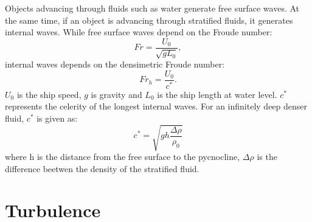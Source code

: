 \documentclass[a4paper, 12pt]{report}
\begin{document}
Objects advancing through fluids such as water generate free surface waves. At the same time, if an object is advancing through stratified fluids, it generates internal waves. While free surface waves depend on the Froude number: 
\begin{equation}
Fr = \frac{U_0}{\sqrt{gL_0}},
\label{eqn:FroudeNumber}
\end{equation} 
internal waves depends on the densimetric Froude number:
\begin{equation}
Fr_h = \frac{U_0}{c^*}.
\label{eqn:densimetricFroudeNumber}
\end{equation}
$U_0$ is the ship speed, $g$ is gravity and $L_0$ is the ship length at water level. $c^*$ represents the celerity of the longest internal waves. For an infinitely deep denser fluid, $c^*$ is given as:
\begin{equation}
c^* = \sqrt{gh\frac{\Delta \rho}{\rho_0}}
\label{eqn:celerityWaves}
\end{equation} 
where h is the distance from the free surface to the pycnocline, $\Delta \rho$ is the difference beetwen the density of the stratified fluid.
\section{Turbulence}
\end{document}
